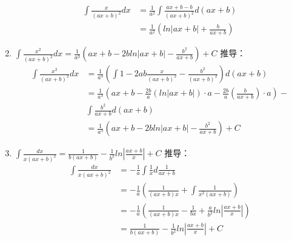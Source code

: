 \begin{enumerate}
\begin{equation}
			\label{eq:adv8}
			\begin{split}
				\int\frac{x}{(ax+b)^2}dx&=\frac{1}{a^2}\int \frac{ax+b-b}{(ax+b)^2}d{(ax+b)}\\ 
				&=\frac{1}{a^2}\left(ln|ax+b|+\frac{b}{ax+b}\right)
			\end{split}
		\end{equation}
		\item $\int\frac{x^2}{(ax+b)^2}dx=\frac{1}{a^3}\left(ax+b-2bln|ax+b|-\frac{b^2}{ax+b}\right)+C$
		推导：
		\begin{equation}
			\begin{split}
				\int\frac{x^2}{(ax+b)^2}dx&=\frac{1}{a^3}\left(\int 1-2ab\frac{x}{(ax+b)^2}-\frac{b^2}{(ax+b)^2}\right)d{(ax+b)}\\ 
				&=\frac{1}{a^3}\left(ax+b -\frac{2b}{a}(ln|ax+b|)\cdot a-\frac{2b}{a}(\frac{b}{ax+b})\cdot a\right)-\\ 
				&\int \frac{b^2}{ax+b}d{(ax+b)}\\ 
				&=\frac{1}{a^3}\left(ax+b-2bln|ax+b|-\frac{b^2}{ax+b}\right)+C
			\end{split}
		\end{equation}
		\item $\int\frac{dx}{x(ax+b)^2}=\frac{1}{b(ax+b)}-\frac{1}{b^2}ln|\frac{ax+b}{x}|+C$
		推导：
		\begin{equation}
			\begin{split}
				\int\frac{dx}{x(ax+b)^2}&=-\frac{1}{a}\int \frac{1}{x}d{\frac{1}{ax+b}}\\ 
				&=-\frac{1}{a}\left(\frac{1}{(ax+b)x}+\int\frac{1}{x^2(ax+b)}\right)\\ 
				&=-\frac{1}{a}\left(\frac{1}{(ax+b)x}-\frac{1}{bx}+\frac{a}{b^2}ln{|\frac{ax+b}{x}|}\right)\\ 
				&=\frac{1}{b(ax+b)}-\frac{1}{b^2}ln|\frac{ax+b}{x}|+C
			\end{split}
		\end{equation}

\end{enumerate}
